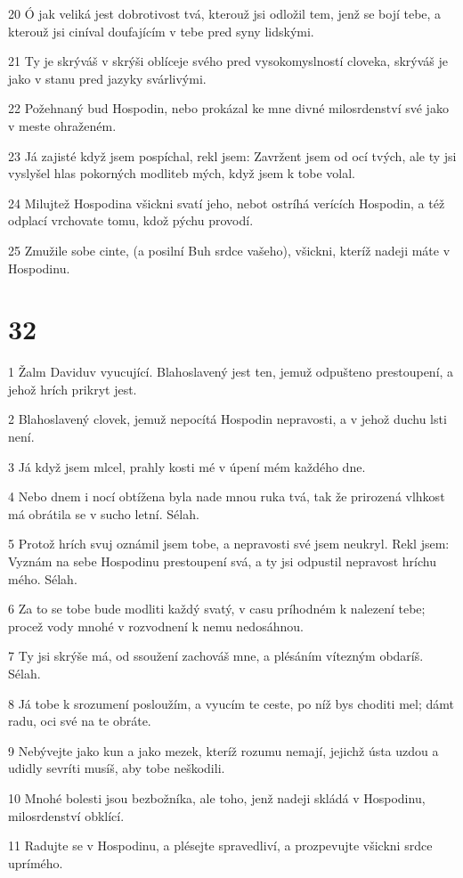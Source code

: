 \par 20 Ó jak veliká jest dobrotivost tvá, kterouž jsi odložil tem, jenž se bojí tebe, a kterouž jsi ciníval doufajícím v tebe pred syny lidskými.
\par 21 Ty je skrýváš v skrýši oblíceje svého pred vysokomyslností cloveka, skrýváš je jako v stanu pred jazyky svárlivými.
\par 22 Požehnaný bud Hospodin, nebo prokázal ke mne divné milosrdenství své jako v meste ohraženém.
\par 23 Já zajisté když jsem pospíchal, rekl jsem: Zavržent jsem od ocí tvých, ale ty jsi vyslyšel hlas pokorných modliteb mých, když jsem k tobe volal.
\par 24 Milujtež Hospodina všickni svatí jeho, nebot ostríhá verících Hospodin, a též odplací vrchovate tomu, kdož pýchu provodí.
\par 25 Zmužile sobe cinte, (a posilní Buh srdce vašeho), všickni, kteríž nadeji máte v Hospodinu.

\chapter{32}

\par 1 Žalm Daviduv vyucující. Blahoslavený jest ten, jemuž odpušteno prestoupení, a jehož hrích prikryt jest.
\par 2 Blahoslavený clovek, jemuž nepocítá Hospodin nepravosti, a v jehož duchu lsti není.
\par 3 Já když jsem mlcel, prahly kosti mé v úpení mém každého dne.
\par 4 Nebo dnem i nocí obtížena byla nade mnou ruka tvá, tak že prirozená vlhkost má obrátila se v sucho letní. Sélah.
\par 5 Protož hrích svuj oznámil jsem tobe, a nepravosti své jsem neukryl. Rekl jsem: Vyznám na sebe Hospodinu prestoupení svá, a ty jsi odpustil nepravost hríchu mého. Sélah.
\par 6 Za to se tobe bude modliti každý svatý, v casu príhodném k nalezení tebe; procež vody mnohé v rozvodnení k nemu nedosáhnou.
\par 7 Ty jsi skrýše má, od ssoužení zachováš mne, a plésáním vítezným obdaríš. Sélah.
\par 8 Já tobe k srozumení posloužím, a vyucím te ceste, po níž bys choditi mel; dámt radu, oci své na te obráte.
\par 9 Nebývejte jako kun a jako mezek, kteríž rozumu nemají, jejichž ústa uzdou a udidly sevríti musíš, aby tobe neškodili.
\par 10 Mnohé bolesti jsou bezbožníka, ale toho, jenž nadeji skládá v Hospodinu, milosrdenství obklící.
\par 11 Radujte se v Hospodinu, a plésejte spravedliví, a prozpevujte všickni srdce uprímého.

